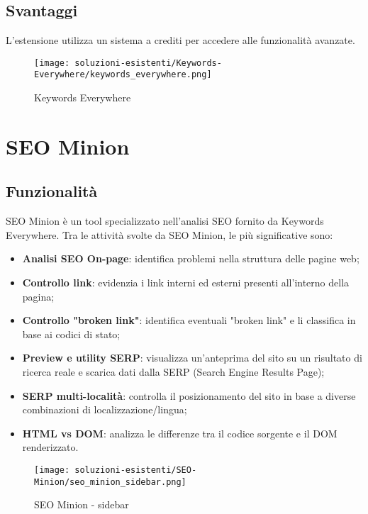 \subsection{Svantaggi}
\par L'estensione utilizza un sistema a crediti per accedere alle funzionalità avanzate.

\begin{figure}[H] 
    \centering 
    \texttt{[image: soluzioni-esistenti/Keywords-Everywhere/keywords\_everywhere.png]} 
    \caption{Keywords Everywhere}
\end{figure}

\section{SEO Minion}

\subsection{Funzionalità}
\par SEO Minion è un tool specializzato nell’analisi SEO fornito da Keywords Everywhere. Tra le attività svolte da SEO Minion, le più significative sono:
\begin{itemize}
    \item \textbf{Analisi SEO On-page}: identifica problemi nella struttura delle pagine web;
    \item \textbf{Controllo link}: evidenzia i link interni ed esterni presenti all’interno della pagina;
    \item \textbf{Controllo "broken link"}: identifica eventuali "broken link" e li classifica in base ai codici di stato;
    \item \textbf{Preview e utility SERP}: visualizza un'anteprima del sito su un risultato di ricerca reale e scarica dati dalla SERP (Search Engine Results Page);
    \item \textbf{SERP multi-località}: controlla il posizionamento del sito in base a diverse combinazioni di localizzazione/lingua;
    \item \textbf{HTML vs DOM}: analizza le differenze tra il codice sorgente e il DOM renderizzato.
\end{itemize}

\begin{figure}[H] 
    \centering 
    \texttt{[image: soluzioni-esistenti/SEO-Minion/seo\_minion\_sidebar.png]} 
    \caption{SEO Minion - sidebar}
\end{figure}

